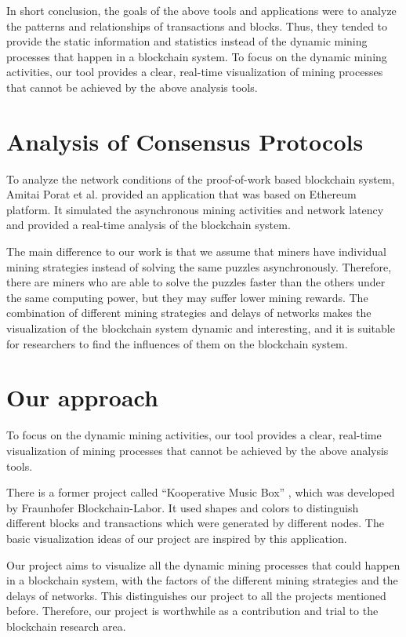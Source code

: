 In short conclusion, the goals of the above tools and applications were to analyze the patterns and relationships of transactions and blocks. Thus, they tended to provide the static information and statistics instead of the dynamic mining processes that happen in a blockchain system. To focus on the dynamic mining activities, our tool provides a clear, real-time visualization of mining processes that cannot be achieved by the above analysis tools.


\section{Analysis of Consensus Protocols}

To analyze the network conditions of the proof-of-work based blockchain system, Amitai Porat et al. \cite{Porat} provided an application that was based on Ethereum platform. It simulated the asynchronous mining activities and network latency and provided a real-time analysis of the blockchain system.

The main difference to our work is that we assume that miners have individual mining strategies instead of solving the same puzzles asynchronously. Therefore, there are miners who are able to solve the puzzles faster than the others under the same computing power, but they may suffer lower mining rewards. The combination of different mining strategies and delays of networks makes the visualization of the blockchain system dynamic and interesting, and it is suitable for researchers to find the influences of them on the blockchain system.

\section{Our approach}

To focus on the dynamic mining activities, our tool provides a clear, real-time visualization of mining processes that cannot be achieved by the above analysis tools.

There is a former project called “Kooperative Music Box” \cite{musicbox}, which was developed by Fraunhofer Blockchain-Labor. It used shapes and colors to distinguish different blocks and transactions which were generated by different nodes. The basic visualization ideas of our project are inspired by this application.

Our project aims to visualize all the dynamic mining processes that could happen in a blockchain system, with the factors of the different mining strategies and the delays of networks. This distinguishes our project to all the projects mentioned before. Therefore, our project is worthwhile as a contribution and trial to the blockchain research area.
